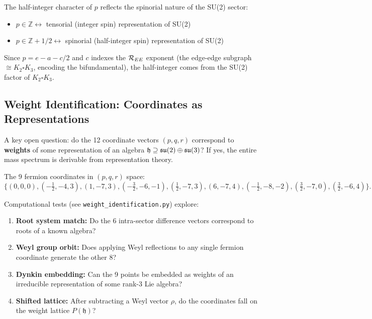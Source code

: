 \begin{conjecture}
The half-integer character of $p$ reflects the spinorial nature of the SU(2) sector:
\begin{itemize}
\item $p \in \mathbb{Z} \leftrightarrow$ tensorial (integer spin) representation of SU(2)
\item $p \in \mathbb{Z} + 1/2 \leftrightarrow$ spinorial (half-integer spin) representation of SU(2)
\end{itemize}
\end{conjecture}

Since $p = e - a - c/2$ and $c$ indexes the $\mathcal{R}_{EE}$ exponent (the edge-edge subgraph $\cong K_2 \square K_3$, encoding the bifundamental), the half-integer comes from the SU(2) factor of $K_2 \square K_3$.

\subsection{Weight Identification: Coordinates as Representations}\label{sec:weight_identification}

A key open question: do the 12 coordinate vectors $(p, q, r)$ correspond to \textbf{weights} of some representation of an algebra $\mathfrak{h} \supseteq \mathfrak{su}(2) \oplus \mathfrak{su}(3)$? If yes, the entire mass spectrum is derivable from representation theory.

The 9 fermion coordinates in $(p, q, r)$ space:
\begin{equation}
\{(0,0,0), (-\tfrac{1}{2},-4,3), (1,-7,3), (-\tfrac{3}{2},-6,-1), (\tfrac{1}{2},-7,3), (6,-7,4), (-\tfrac{1}{2},-8,-2), (\tfrac{3}{2},-7,0), (\tfrac{3}{2},-6,4)\}.
\end{equation}

Computational tests (see \texttt{weight\_identification.py}) explore:
\begin{enumerate}
\item \textbf{Root system match:} Do the 6 intra-sector difference vectors correspond to roots of a known algebra?
\item \textbf{Weyl group orbit:} Does applying Weyl reflections to any single fermion coordinate generate the other 8?
\item \textbf{Dynkin embedding:} Can the 9 points be embedded as weights of an irreducible representation of some rank-3 Lie algebra?
\item \textbf{Shifted lattice:} After subtracting a Weyl vector $\rho$, do the coordinates fall on the weight lattice $P(\mathfrak{h})$?
\end{enumerate}

